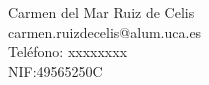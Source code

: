 Carmen del Mar Ruiz de Celis \\ %
carmen.ruizdecelis@alum.uca.es \\ %
Teléfono: xxxxxxxx \\ %
NIF:49565250C  \\ %
